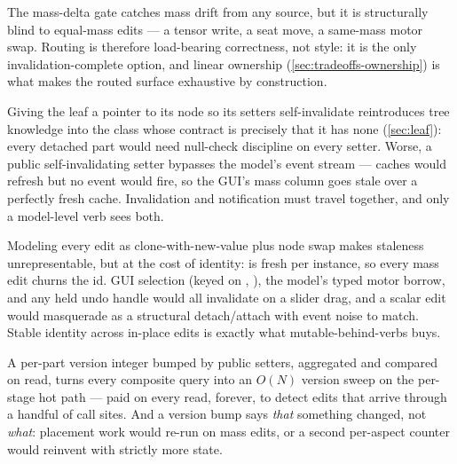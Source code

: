 \begin{keyinsight}
The mass-delta gate catches mass drift from any source, but it is structurally blind to
equal-mass edits --- a tensor write, a seat move, a same-mass motor swap. Routing is
therefore load-bearing correctness, not style: it is the only invalidation-complete
option, and linear ownership (\cref{sec:tradeoffs-ownership}) is what makes the routed
surface exhaustive by construction.
\end{keyinsight}

\begin{rejected}
Giving the leaf a pointer to its node so its setters self-invalidate reintroduces tree
knowledge into the class whose contract is precisely that it has none
(\cref{sec:leaf}): every detached part would need null-check discipline on every setter.
Worse, a public self-invalidating setter bypasses the model's event stream --- caches
would refresh but no  event would fire, so the GUI's mass column goes stale
over a perfectly fresh cache. Invalidation and notification must travel together, and
only a model-level verb sees both.
\end{rejected}

\begin{rejected}
Modeling every edit as clone-with-new-value plus node swap makes staleness
unrepresentable, but at the cost of identity:  is fresh per instance, so
every mass edit churns the id. GUI selection (keyed on
, ), the model's typed
motor borrow, and any held undo handle would all invalidate on a slider drag, and a
scalar edit would masquerade as a structural detach/attach with event noise to match.
Stable identity across in-place edits is exactly what mutable-behind-verbs buys.
\end{rejected}

\begin{rejected}
A per-part version integer bumped by public setters, aggregated and compared on read,
turns every composite query into an $O(N)$ version sweep on the per-stage hot path ---
paid on every read, forever, to detect edits that arrive through a handful of call
sites. And a version bump says \emph{that} something changed, not \emph{what}: placement
work would re-run on mass edits, or a second per-aspect counter would reinvent
 with strictly more state.
\end{rejected}

